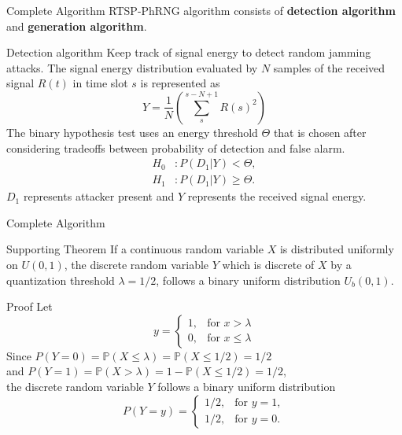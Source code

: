 \documentclass{beamer}
\providecommand{\brak}[1]{\ensuremath{\left(#1\right)}}
\begin{document}
\begin{frame}{Complete Algorithm}
    RTSP-PhRNG algorithm consists of \textbf{detection algorithm} and \textbf{generation algorithm}.
    \begin{block}{Detection algorithm} 
        Keep track of signal energy to detect random jamming attacks.
        The signal energy distribution evaluated by $N$ samples of the received signal $R\brak{t}$ in time slot $s$ is represented as
        \begin{equation}
            Y=\frac{1}{N}\brak{\sum_{s}^{s-N+1}R\brak{s}^{2}}
        \end{equation}
        The binary hypothesis test uses an energy threshold $\Theta$ that is chosen after considering tradeoffs between probability of detection and false alarm.
        \begin{align}
            H_{0} &: P\brak{D_{1}|Y}<\Theta,\nonumber\\
            H_{1} &: P\brak{D_{1}|Y}\geq{\Theta}.\label{eq:12}
        \end{align}
        $D_{1}$ represents attacker present and $Y$ represents the received signal energy.
    \end{block}
\end{frame}
\begin{frame}{Complete Algorithm}
    \begin{block}{Supporting Theorem}
        If a continuous random variable $X$ is distributed uniformly on $U\brak{0,1}$, the discrete random variable $Y$ which is discrete of $X$ by a quantization threshold $\lambda=1/2$, follows a binary uniform distribution $U_{b}\brak{0,1}$.
    \end{block}
    \begin{block}{Proof}
        Let \begin{equation}
            y=
            \begin{cases}
            1, &\text{for } x>\lambda\\
            0, &\text{for } x\leq{\lambda}
            \end{cases}
        \end{equation}
        Since $P\brak{Y=0}=\mathbb{P}\brak{X\leq{\lambda}}=\mathbb{P}\brak{X\leq{1/2}}=1/2$\\
        and $P\brak{Y=1}=\mathbb{P}\brak{X>{\lambda}}=1-\mathbb{P}\brak{X\leq{1/2}}=1/2$,\\
        the discrete random variable $Y$ follows a binary uniform distribution
        \begin{equation}
            P\brak{Y=y}=
            \begin{cases}
            1/2, &\text{for }y=1,\\
            1/2, &\text{for }y=0.
            \end{cases}
        \end{equation}
    \end{block}
\end{frame}
\end{document}
